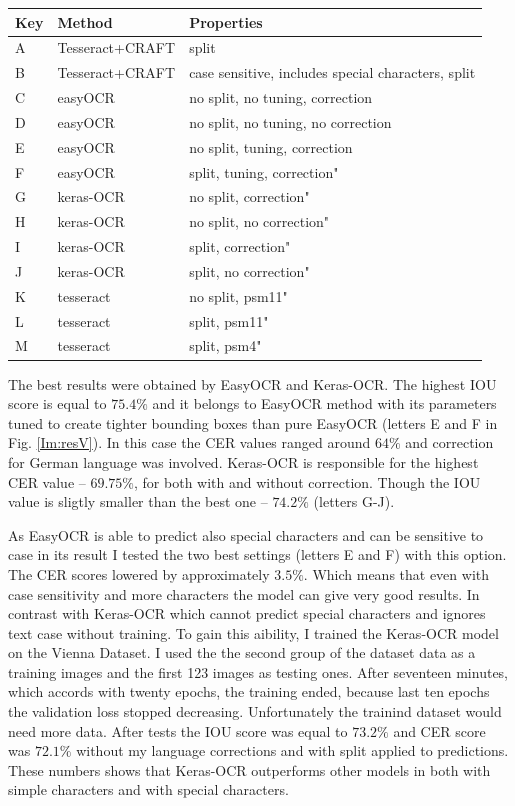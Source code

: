 \begin{table}[!ht]
    \centering
    \begin{tabular}{|l|l|l|}
    \hline
        Key & Method & Properties \\ \hline
        A & Tesseract+CRAFT & split \\
        B & Tesseract+CRAFT & case sensitive, includes special characters, split \\ \hline
        C & easyOCR & no split, no tuning, correction\\
        D & easyOCR & no split, no tuning, no correction \\
        E & easyOCR & no split, tuning, correction\\
        F & easyOCR & split, tuning, correction" \\ \hline
        G & keras-OCR & no split, correction" \\
        H & keras-OCR & no split, no correction" \\ 
        I & keras-OCR & split, correction" \\ 
        J & keras-OCR & split, no correction" \\ \hline
        K & tesseract & no split, psm11" \\ 
        L & tesseract & split, psm11" \\ 
        M & tesseract & split, psm4" \\ \hline
    \end{tabular}
    \label{Tab:resV}
\end{table}

The best results were obtained by EasyOCR and Keras-OCR. The highest IOU score is equal to $75.4\%$ and it belongs to EasyOCR method with its parameters tuned to create tighter bounding boxes than pure EasyOCR (letters E and F in Fig. \ref*{Im:resV}). In this case the CER values ranged around $64\%$ and correction for German language was involved.
Keras-OCR is responsible for the highest CER value -- $69.75\%$, for both with and without correction. Though the IOU value is sligtly smaller than the best one -- $74.2\%$ (letters G-J). 

As EasyOCR is able to predict also special characters and can be sensitive to case in its result I tested the two best settings (letters E and F) with this option. The CER scores lowered by approximately $3.5\%$. Which means that even with case sensitivity and more characters the model can give very good results. In contrast with Keras-OCR which cannot predict special characters and ignores text case without training. To gain this aibility, I trained the Keras-OCR model on the Vienna Dataset. I used the the second group of the dataset data as a training images and the first 123 images as testing ones. After seventeen minutes, which accords with twenty epochs, the training ended, because last ten epochs the validation loss stopped decreasing. Unfortunately the trainind dataset would need more data. After tests the IOU score was equal to $73.2\%$ and CER score was $72.1\%$ without my language corrections and with split applied to predictions. These numbers shows that Keras-OCR outperforms other models in both with simple characters and with special characters.

